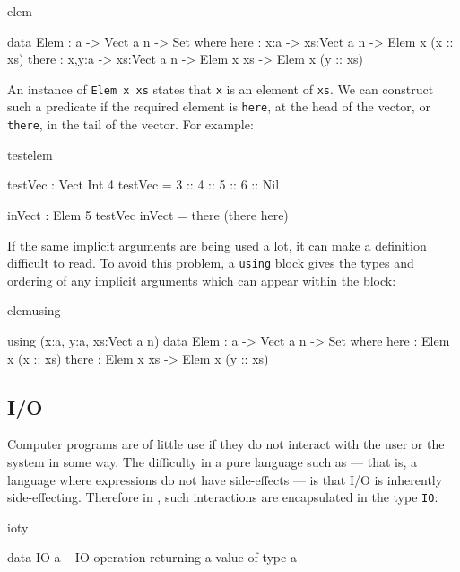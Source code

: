 \begin{SaveVerbatim}{elem}

data Elem : a -> Vect a n -> Set where
   here :  {x:a} ->   {xs:Vect a n} -> Elem x (x :: xs)
   there : {x,y:a} -> {xs:Vect a n} -> Elem x xs -> Elem x (y :: xs)

\end{SaveVerbatim}

\noindent
An instance of \texttt{Elem x xs} states that \texttt{x} is an element of 
\texttt{xs}. We can construct
such a predicate if the required element is \texttt{here}, at the head of the vector, 
or \texttt{there}, in the tail of the vector. For example:

\begin{SaveVerbatim}{testelem}

testVec : Vect Int 4
testVec = 3 :: 4 :: 5 :: 6 :: Nil

inVect : Elem 5 testVec
inVect = there (there here)

\end{SaveVerbatim}

\noindent
If the same implicit arguments are being used a lot, it can make a definition
difficult to read. To avoid this problem, a \texttt{using} block gives the types and
ordering of any implicit arguments which can appear within the block:

\begin{SaveVerbatim}{elemusing}

using (x:a, y:a, xs:Vect a n)
  data Elem : a -> Vect a n -> Set where
     here  : Elem x (x :: xs)
     there : Elem x xs -> Elem x (y :: xs)

\end{SaveVerbatim}

\subsection{I/O}

Computer programs are of little use if they do not interact with the user or
the system in some way. The difficulty in a pure language such as \Idris{} ---
that is, a language where expressions do not have side-effects --- is that I/O
is inherently side-effecting. Therefore in \Idris{}, such interactions are
encapsulated in the type \texttt{IO}:

\begin{SaveVerbatim}{ioty}

data IO a -- IO operation returning a value of type a

\end{SaveVerbatim}

